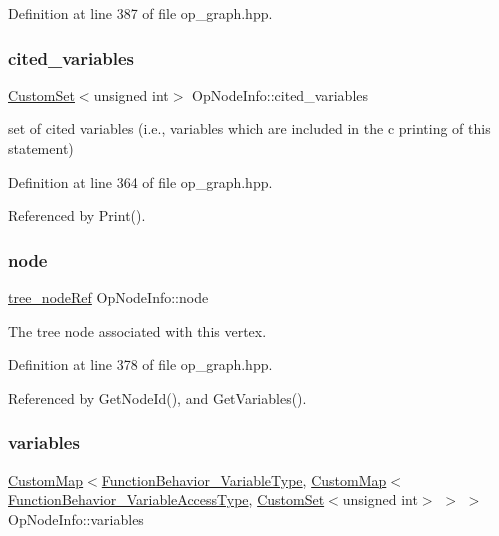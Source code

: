 Definition at line 387 of file op\+\_\+graph.\+hpp.

\mbox{\label{structOpNodeInfo_af4643b1d75b6daa18efdecdc7d01c03a}} 
\subsubsection{\texorpdfstring{cited\+\_\+variables}{cited\_variables}}
{\footnotesize\ttfamily \hyperlink{custom__set_8hpp_a615bc2f42fc38a4bb1790d12c759e86f}{Custom\+Set}$<$unsigned int$>$ Op\+Node\+Info\+::cited\+\_\+variables}



set of cited variables (i.\+e., variables which are included in the c printing of this statement) 



Definition at line 364 of file op\+\_\+graph.\+hpp.



Referenced by Print().

\mbox{\label{structOpNodeInfo_ad4732d50b380fd617f577967b00ecd02}} 
\subsubsection{\texorpdfstring{node}{node}}
{\footnotesize\ttfamily \hyperlink{tree__node_8hpp_a6ee377554d1c4871ad66a337eaa67fd5}{tree\+\_\+node\+Ref} Op\+Node\+Info\+::node}



The tree node associated with this vertex. 



Definition at line 378 of file op\+\_\+graph.\+hpp.



Referenced by Get\+Node\+Id(), and Get\+Variables().

\mbox{\label{structOpNodeInfo_a5df54db9835f77f508db845c3726c639}} 
\subsubsection{\texorpdfstring{variables}{variables}}
{\footnotesize\ttfamily \hyperlink{custom__map_8hpp_a18ca01763abbe3e5623223bfe5aaac6b}{Custom\+Map}$<$\hyperlink{function__behavior_8hpp_aff0ab7827d49a7aca1f277e0ff126755}{Function\+Behavior\+\_\+\+Variable\+Type}, \hyperlink{custom__map_8hpp_a18ca01763abbe3e5623223bfe5aaac6b}{Custom\+Map}$<$\hyperlink{function__behavior_8hpp_a68c28bfcfefbe63cece191e941af0409}{Function\+Behavior\+\_\+\+Variable\+Access\+Type}, \hyperlink{custom__set_8hpp_a615bc2f42fc38a4bb1790d12c759e86f}{Custom\+Set}$<$unsigned int$>$ $>$ $>$ Op\+Node\+Info\+::variables}



